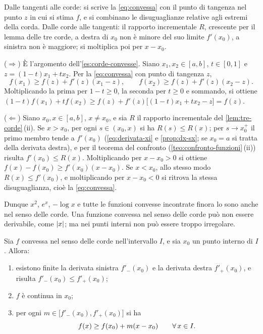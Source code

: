 \begin{strategia}
Dalle tangenti alle corde: si scrive la \eqref{eq:convessa} con il punto di tangenza nel
punto $z$ in cui si stima $f$, e si combinano le disuguaglianze relative agli estremi
della corda. Dalle corde alle tangenti: il rapporto incrementale $R$, crescente per il
lemma delle tre corde, a destra di $x_{0}$ non è minore del suo limite $f'(x_{0})$, a
sinistra non è maggiore; si moltiplica poi per $x-x_{0}$.
\end{strategia}

\begin{dimostrazione}
($\Rightarrow$) È l'argomento dell'\cref{es:corde-convesse}. Siano $x_{1},x_{2}\in[a,b]$,
$t\in[0,1]$ e $z=(1-t)x_{1}+tx_{2}$. Per la \eqref{eq:convessa} con punto di tangenza $z$,
\[
  f(x_{1})\ge f(z)+f'(z)(x_{1}-z), \qquad f(x_{2})\ge f(z)+f'(z)(x_{2}-z) .
\]
Moltiplicando la prima per $1-t\ge0$, la seconda per $t\ge0$ e sommando, si ottiene
$(1-t)f(x_{1})+tf(x_{2})\ge f(z)+f'(z)\bigl[(1-t)x_{1}+tx_{2}-z\bigr]=f(z)$.

($\Leftarrow$) Siano $x_{0},x\in[a,b]$, $x\neq x_{0}$, e sia $R$ il rapporto incrementale
del \cref{lem:tre-corde}\,(ii). Se $x>x_{0}$, per ogni $s\in(x_{0},x)$ si ha
$R(s)\le R(x)$; per $s\to x_{0}^{+}$ il primo membro tende a $f'(x_{0})$
(\eqref{eq:derivata-xi} e \cref{prop:dx-sx}; se $x_{0}=a$ si tratta della derivata
destra), e per il teorema del confronto (\cref{teo:confronto-funzioni}\,(ii)) risulta
$f'(x_{0})\le R(x)$. Moltiplicando per $x-x_{0}>0$ si ottiene
$f(x)-f(x_{0})\ge f'(x_{0})(x-x_{0})$. Se $x<x_{0}$, allo stesso modo $R(x)\le f'(x_{0})$,
e moltiplicando per $x-x_{0}<0$ si ritrova la stessa disuguaglianza, cioè la
\eqref{eq:convessa}.
\end{dimostrazione}

Dunque $x^{2}$, $e^{x}$, $-\log x$ e tutte le funzioni convesse incontrate finora lo sono
anche nel senso delle corde. Una funzione convessa nel senso delle corde può non essere
derivabile, come $\lvert x\rvert$; ma nei punti interni non può essere troppo irregolare.

\begin{teorema}\label{teo:convesse-continue}
Sia $f$ convessa nel senso delle corde nell'intervallo $I$, e sia $x_{0}$ un punto
interno di $I$. Allora:
\begin{enumerate}[label=\textup{(\roman*)}]
  \item esistono finite la derivata sinistra $f'_{-}(x_{0})$ e la derivata destra
  $f'_{+}(x_{0})$, e risulta $f'_{-}(x_{0})\le f'_{+}(x_{0})$;
  \item $f$ è continua in $x_{0}$;
  \item per ogni $m\in\bigl[f'_{-}(x_{0}),f'_{+}(x_{0})\bigr]$ si ha
  \begin{equation}\label{eq:retta-appoggio}
    f(x)\ge f(x_{0})+m(x-x_{0}) \qquad\forall\, x\in I .
  \end{equation}
\end{enumerate}
\end{teorema}

